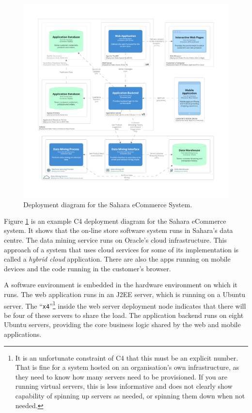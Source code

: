 \begin{figure}[h!]
    \centering
    \begin{adjustwidth}{-7.5mm}{-7.5mm}
        \includegraphics[trim=195 235 195 198,clip,width=0.95\paperwidth]{images/c4/deployment_diagram.png}
    \end{adjustwidth}
    \caption{Deployment diagram for the Sahara eCommerce System.}
    \label{fig:c4_deployment}
\end{figure}

Figure \ref{fig:c4_deployment} is an example C4 deployment diagram for the Sahara eCommerce system.
It shows that the on-line store software system runs in Sahara's data centre.
The data mining service runs on Oracle's cloud infrastructure.
This approach of a system that uses cloud services for some of its implementation is called a \emph{hybrid cloud} application.
There are also the apps running on mobile devices and the code running in the customer's browser.

A software environment is embedded in the hardware environment on which it runs.
The web application runs in an  J2EE server, which is running on a Ubuntu server.
The ``\texttt{x4}''\footnote{It is an unfortunate constraint of C4 that this must be an explicit number.
That is fine for a system hosted on an organisation's own infrastructure, as they need to know how many servers need to be provisioned.
If you are running virtual servers, this is less informative and does not clearly show capability of spinning up
servers as needed, or spinning them down when not needed.}
inside the web server deployment node indicates that there will be four of these servers to share the load.
The application backend runs on eight Ubuntu servers, providing the core business logic shared by the web and mobile applications.

